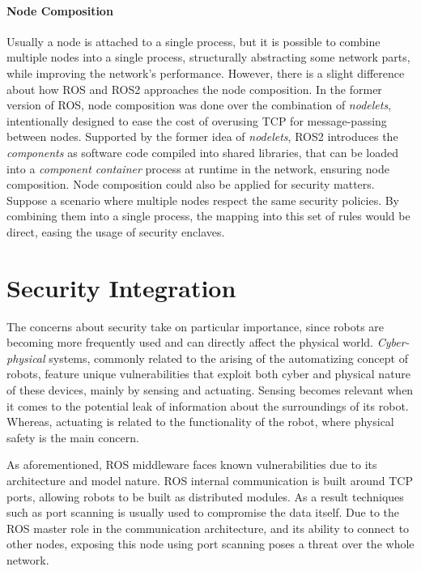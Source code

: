 \paragraph{Node Composition}
               
Usually a node is attached to a single process, but it is possible to combine multiple nodes into a single process, structurally abstracting some network parts, while improving the network's performance. However, there is a slight difference about how ROS and ROS2 approaches the node composition. In the former version of ROS, node composition was done over the combination of \textit{nodelets}, intentionally designed to ease the cost of overusing TCP for message-passing between nodes. Supported by the former idea of \textit{nodelets}, ROS2 introduces the \textit{components} as software code compiled into shared libraries, that can be loaded into a \textit{component container} process at runtime in the network, ensuring node composition. Node composition could also be applied for security matters. Suppose a scenario where multiple nodes respect the same security policies. By combining them into a single process, the mapping into this set of rules would be direct, easing the usage of security enclaves.
               

\section{Security Integration}

The concerns about security take on particular importance, since robots are becoming more frequently used and can directly affect the physical world. \textit{Cyber-physical} systems, commonly related to the arising of the automatizing concept of robots, feature unique vulnerabilities that exploit both cyber and physical nature of these devices, mainly by sensing and actuating. Sensing becomes relevant when it comes to the potential leak of information about the surroundings of its robot. Whereas, actuating is related to the functionality of the robot, where physical safety is the main concern. \cite{mcclean2013preliminary}

As aforementioned, ROS middleware faces known vulnerabilities due to its architecture and model nature. ROS internal communication is built around TCP ports, allowing robots to be built as distributed modules. As a result techniques such as port scanning is usually used to compromise the data itself. Due to the ROS master role in the communication architecture, and its ability to connect to other nodes, exposing this node using port scanning poses a threat over the whole network. \cite{8794451}

